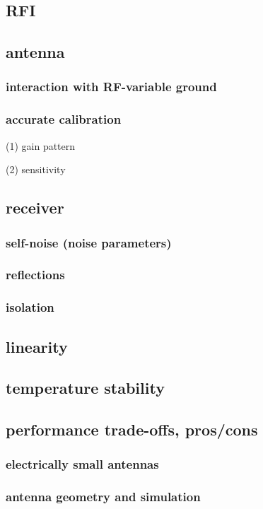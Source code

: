 \subsection{RFI}
\subsection{antenna}
\subsubsection{interaction with RF-variable ground}
\subsubsection{accurate calibration}

(1)	gain pattern

(2)	sensitivity 

\subsection{receiver}
\subsubsection{self-noise (noise parameters)}
\subsubsection{reflections}
\subsubsection{isolation}
\subsection{linearity}
\subsection{temperature stability}

\subsection{performance trade-offs, pros/cons}
\subsubsection{electrically small antennas}
\subsubsection{antenna geometry and simulation}
